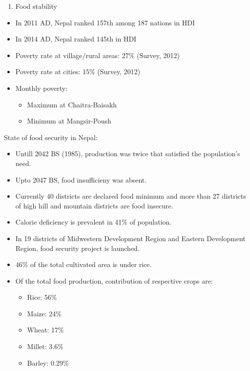 \documentclass[
]{book}
\providecommand{\tightlist}{%
  \setlength{\itemsep}{0pt}\setlength{\parskip}{0pt}}
\begin{document}
\begin{enumerate}
\def\labelenumi{\arabic{enumi}.}
\setcounter{enumi}{3}
\tightlist
\item
  Food stability
\end{enumerate}

\begin{itemize}
\tightlist
\item
  In 2011 AD, Nepal ranked 157th among 187 nations in HDI
\item
  In 2014 AD, Nepal ranked 145th in HDI
\item
  Poverty rate at village/rural areas: 27\% (Survey, 2012)
\item
  Poverty rate at cities: 15\% (Survey, 2012)
\item
  Monthly poverty:

  \begin{itemize}
  \tightlist
  \item
    Maximum at Chaitra-Baisakh
  \item
    Minimum at Mangsir-Poush
  \end{itemize}
\end{itemize}

State of food security in Nepal:

\begin{itemize}
\tightlist
\item
  Untill 2042 BS (1985), production was twice that satisfied the population's need.
\item
  Upto 2047 BS, food insufficieny was absent.
\item
  Currently 40 districts are declared food minimum and more than 27 districts of high hill and mountain districts are food insecure.
\item
  Calorie deficiency is prevalent in 41\% of population.
\item
  In 19 districts of Midwestern Development Region and Eastern Development Region, food security project is launched.
\item
  46\% of the total cultivated area is under rice.
\item
  Of the total food production, contribution of respective crops are:

  \begin{itemize}
  \tightlist
  \item
    Rice: 56\%
  \item
    Maize: 24\%
  \item
    Wheat: 17\%
  \item
    Millet: 3.6\%
  \item
    Barley: 0.29\%
  \end{itemize}
\end{itemize}
\end{document}
